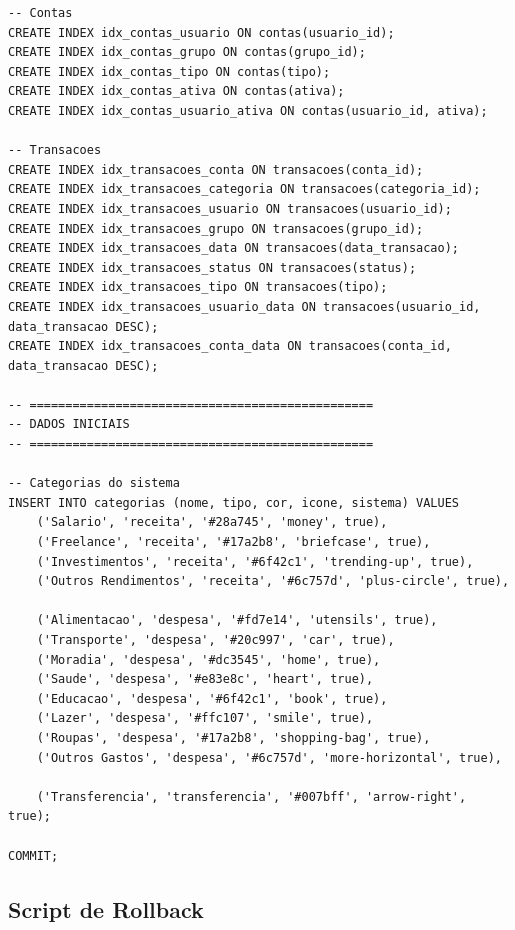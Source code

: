 \begin{lstlisting}[caption=Script completo de criacao do banco]
-- Contas
CREATE INDEX idx_contas_usuario ON contas(usuario_id);
CREATE INDEX idx_contas_grupo ON contas(grupo_id);
CREATE INDEX idx_contas_tipo ON contas(tipo);
CREATE INDEX idx_contas_ativa ON contas(ativa);
CREATE INDEX idx_contas_usuario_ativa ON contas(usuario_id, ativa);

-- Transacoes
CREATE INDEX idx_transacoes_conta ON transacoes(conta_id);
CREATE INDEX idx_transacoes_categoria ON transacoes(categoria_id);
CREATE INDEX idx_transacoes_usuario ON transacoes(usuario_id);
CREATE INDEX idx_transacoes_grupo ON transacoes(grupo_id);
CREATE INDEX idx_transacoes_data ON transacoes(data_transacao);
CREATE INDEX idx_transacoes_status ON transacoes(status);
CREATE INDEX idx_transacoes_tipo ON transacoes(tipo);
CREATE INDEX idx_transacoes_usuario_data ON transacoes(usuario_id, data_transacao DESC);
CREATE INDEX idx_transacoes_conta_data ON transacoes(conta_id, data_transacao DESC);

-- ================================================
-- DADOS INICIAIS
-- ================================================

-- Categorias do sistema
INSERT INTO categorias (nome, tipo, cor, icone, sistema) VALUES
    ('Salario', 'receita', '#28a745', 'money', true),
    ('Freelance', 'receita', '#17a2b8', 'briefcase', true),
    ('Investimentos', 'receita', '#6f42c1', 'trending-up', true),
    ('Outros Rendimentos', 'receita', '#6c757d', 'plus-circle', true),
    
    ('Alimentacao', 'despesa', '#fd7e14', 'utensils', true),
    ('Transporte', 'despesa', '#20c997', 'car', true),
    ('Moradia', 'despesa', '#dc3545', 'home', true),
    ('Saude', 'despesa', '#e83e8c', 'heart', true),
    ('Educacao', 'despesa', '#6f42c1', 'book', true),
    ('Lazer', 'despesa', '#ffc107', 'smile', true),
    ('Roupas', 'despesa', '#17a2b8', 'shopping-bag', true),
    ('Outros Gastos', 'despesa', '#6c757d', 'more-horizontal', true),
    
    ('Transferencia', 'transferencia', '#007bff', 'arrow-right', true);

COMMIT;
\end{lstlisting}

\subsection{Script de Rollback}

